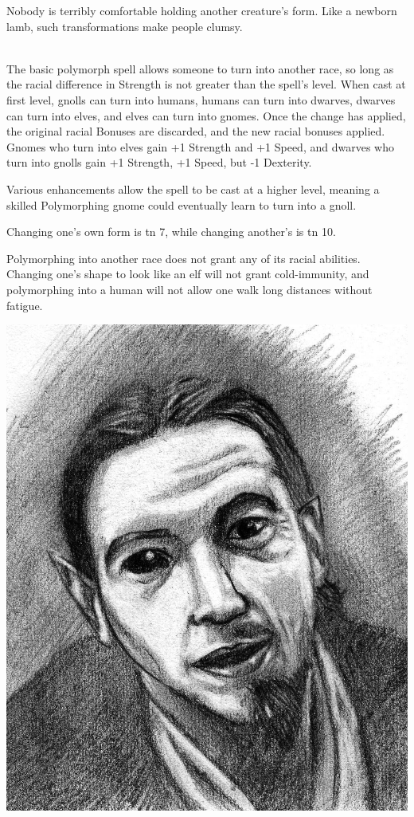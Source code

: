 \documentclass[titlepage,a4paper,openany]{book}
\begin{document}
\begin{multicols}{2}
Nobody is terribly comfortable holding another creature's form.  Like a newborn lamb, such transformations make people clumsy.

\spelllevel

\\
The basic polymorph spell allows someone to turn into another race, so long as the racial difference in Strength is not greater than the spell's level.
When cast at first level, gnolls can turn into humans, humans can turn into dwarves, dwarves can turn into elves, and elves can turn into gnomes.
Once the change has applied, the original racial Bonuses are discarded, and the new racial bonuses applied.
Gnomes who turn into elves gain +1 Strength and +1 Speed, and dwarves who turn into gnolls gain +1 Strength, +1 Speed, but -1 Dexterity.

Various enhancements allow the spell to be cast at a higher level, meaning a skilled Polymorphing gnome could eventually learn to turn into a gnoll.

Changing one's own form is \gls{tn} 7, while changing another's is \gls{tn} 10.

Polymorphing into another race does not grant any of its racial abilities.  Changing one's shape to look like an elf will not grant cold-immunity, and polymorphing into a human will not allow one walk long distances without fatigue.

\includegraphics[width=.8\linewidth]{images/Roch_Hercka/polymorph.jpg}
\label{roch:polymorph}


\end{multicols}
\end{document}
